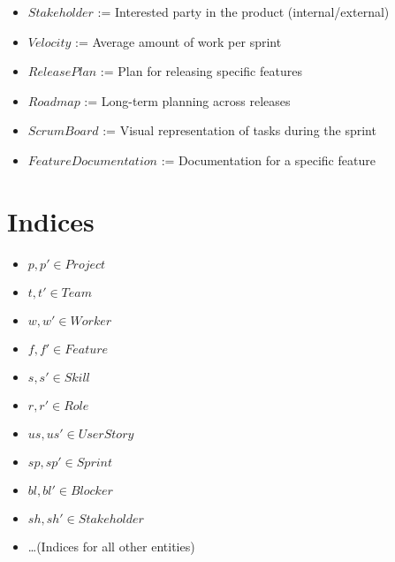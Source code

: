 \documentclass{article}
\begin{document}
\begin{itemize}
    \item $Stakeholder$ := Interested party in the product (internal/external)
    \item $Velocity$ := Average amount of work per sprint
    \item $ReleasePlan$ := Plan for releasing specific features
    \item $Roadmap$ := Long-term planning across releases
    \item $ScrumBoard$ := Visual representation of tasks during the sprint
    \item $FeatureDocumentation$ := Documentation for a specific feature
\end{itemize}

\section{Indices}
\begin{itemize}
    \item $p, p' \in Project$
    \item $t, t' \in Team$
    \item $w, w' \in Worker$
    \item $f, f' \in Feature$
    \item $s, s' \in Skill$
    \item $r, r' \in Role$
    \item $us, us' \in UserStory$
    \item $sp, sp' \in Sprint$
    \item $bl, bl' \in Blocker$
    \item $sh, sh' \in Stakeholder$
    \item \dots (Indices for all other entities)
\end{itemize}
\end{document}
